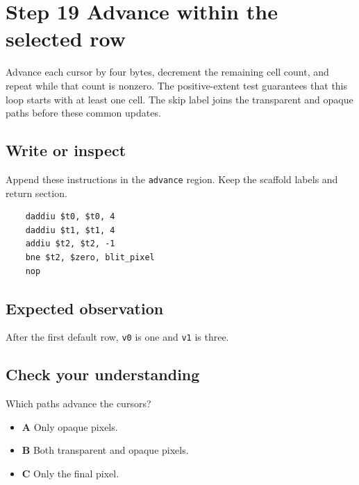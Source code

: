 \section{Step 19 Advance within the selected row}\label{blit-s19}

Advance each cursor by four bytes, decrement the remaining cell count, and repeat while that count is nonzero. The positive-extent test guarantees that this loop starts with at least one cell. The skip label joins the transparent and opaque paths before these common updates.

\subsection{Write or inspect}
Append these instructions in the \texttt{advance} region. Keep the scaffold labels and return section.

\begin{verbatim}
    daddiu $t0, $t0, 4
    daddiu $t1, $t1, 4
    addiu $t2, $t2, -1
    bne $t2, $zero, blit_pixel
    nop
\end{verbatim}

\subsection{Expected observation}
After the first default row, \texttt{v0} is one and \texttt{v1} is three.

\subsection{Check your understanding}
Which paths advance the cursors?

\begin{itemize}
  \item \textbf{A} Only opaque pixels.
  \item \textbf{B} Both transparent and opaque pixels.
  \item \textbf{C} Only the final pixel.
\end{itemize}
